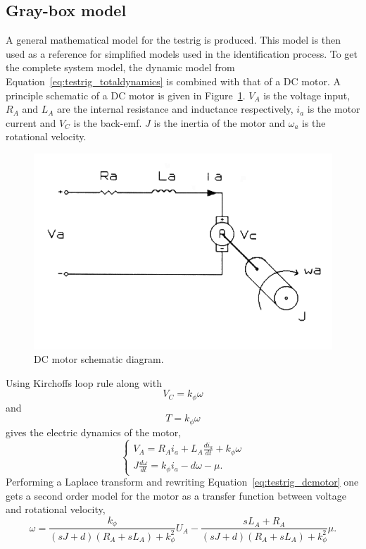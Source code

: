 \subsection{Gray-box model}
A general mathematical model for the testrig is produced. This model is then used
as a reference for simplified models used in the identification process.
To get the complete system model, the dynamic model from
Equation~\ref{eq:testrig_totaldynamics} is combined with that of a DC motor. A
principle schematic of a DC motor is given in
Figure~\ref{fig:testrig_dcmotor_model}. $V_A$ is the voltage input, $R_A$ and
$L_A$ are the internal resistance and inductance respectively, $i_a$ is the
motor current and $V_C$ is the back-emf. $J$ is the inertia of the motor and
$\omega_a$ is the rotational velocity.
\begin{figure}[H]
    \centering
    \includegraphics[width=\textwidth]{./img/testrig_dcmotor_model.png}
    \caption{DC motor schematic diagram.}\label{fig:testrig_dcmotor_model}
\end{figure}
Using Kirchoffs loop rule along with 
\begin{equation} \label{eq:testrig_kphi_v}
    V_C = k_{\phi} \omega
\end{equation}
and 
\begin{equation} \label{eq:testrig_kphi_i}
    T = k_{\phi} \omega
\end{equation}
gives the electric dynamics of the motor,
\begin{equation} \label{eq:testrig_dcmotor}
    \begin{cases} 
        V_A = R_A i_a + L_A \frac{di_a}{dt} + k_{\phi}\omega \\
        J \frac{d\omega} {dt} = k_{\phi} i_a - d\omega - \mu. 
    \end{cases}
\end{equation}
Performing a Laplace transform and rewriting Equation~\ref{eq:testrig_dcmotor}
one gets a second order model for the motor as a transfer function between
voltage and rotational velocity,
\begin{equation} \label{eq:testrig_motor_2ndorder}
    \omega = \frac {k_{\phi}} {(sJ + d) (R_A + sL_A) + k_{\phi}^2} U_A -
    \frac {sL_A + R_A} {(sJ + d) (R_A + sL_A) + k_{\phi}^2} \mu.
\end{equation}

